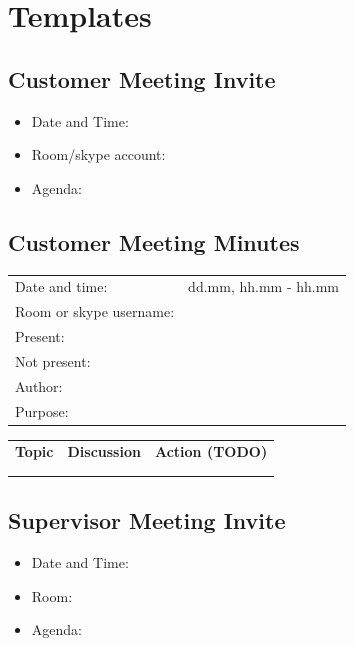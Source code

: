 \chapter{Templates}
\label{chap:templates}

\clearpage

\section{Customer Meeting Invite}

\begin{itemize}
	\item Date and Time:
	\item Room/skype account:
	\item Agenda:
\end{itemize}

\section{Customer Meeting Minutes}

\begin{tabular}{| p{3cm} | p{9cm} |}
	\hline
	\rowcolor{gray}
	\multicolumn{2}{|c|}{\Large \bf Meeting Minutes - Customer Meeting} \\ \hline
	Date and time: & dd.mm,  hh.mm - hh.mm \\ \hline
	Room or skype username: &  \\ \hline
	Present: &  \\ \hline
	Not present: &  \\ \hline
	Author: &  \\ \hline
	Purpose: &  \\ \hline
\end{tabular}

\begin{tabular}{| p{} | p{} | p{} |}
	\hline
	\rowcolor{gray}
	\multicolumn{3}{|c|}{\Large \bf Agenda} \\ \hline
	{\bf Topic} & {\bf Discussion} & {\bf Action (TODO)} \\ \hline
	& & \\ \hline
	& & \\ \hline
\end{tabular}

\section{Supervisor Meeting Invite}

\begin{itemize}
	\item Date and Time:
	\item Room:
	\item Agenda:
\end{itemize}

